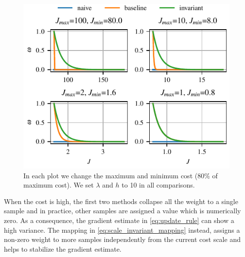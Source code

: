 \begin{figure}[t]
    \centering
    \includegraphics{figures/likelihood_mapping.pdf}
    \caption{In each plot we change the maximum and minimum cost ($80$\% of maximum cost). We set $\lambda$ and $h$ to 10 in all comparisons.}
    \label{fig:exponential_mapping_comparison}
\end{figure}

When the cost is high, the first two methods collapse all the weight to a single sample and in practice, other samples are assigned a value which is numerically zero. As a consequence, the gradient estimate in \eqref{eq:update_rule} can show a high variance. The mapping in \eqref{eq:scale_invariant_mapping} instead, assigns a non-zero weight to more samples independently from the current cost scale and helps to stabilize the gradient estimate.

